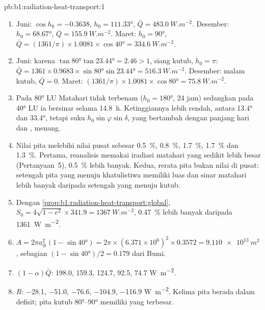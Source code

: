 \begin{solution}{pb:b1:radiation-heat-transport:1}
\begin{enumerate}
  \item Juni: $\cos h_0 = -0.3638$, $h_0 = \ang{111.33}$, $\bar Q =
        \qty{483.0}{W.m^{-2}}$. Desember: $h_0 = \ang{68.67}$, $\bar Q =
        \qty{155.9}{W.m^{-2}}$. Maret: $h_0 = \ang{90}$, $\bar Q = (1361/\pi)
        \times 1.0081 \times \cos\ang{40} = \qty{334.6}{W.m^{-2}}$.
  \item Juni: karena $\tan\ang{80}\tan\ang{23.44} = 2.46 > 1$, siang kutub, $h_0 = \pi$:
        $\bar Q = 1361 \times 0.9683 \times \sin\ang{80}\sin\ang{23.44} =
        \qty{516.3}{W.m^{-2}}$. Desember: malam kutub, $\bar Q = 0$. Maret:
        $(1361/\pi) \times 1.0081 \times \cos\ang{80} = \qty{75.8}{W.m^{-2}}$.
  \item Pada \ang{80} LU Matahari tidak terbenam ($h_0 = \ang{180}$, 24 jam) sedangkan pada
        \ang{40} LU ia bersinar selama \qty{14.8}{h}. Ketinggiannya lebih rendah, antara
        \ang{13.4} dan \ang{33.4}, tetapi suku $h_0\sin\varphi\sin\delta$, yang
        bertambah dengan panjang hari dan , menang.
  \item Nilai pita melebihi nilai pusat sebesar \qty{0.5}{\percent},
        \qty{0.8}{\percent}, \qty{1.7}{\percent}, \qty{1.7}{\percent} dan
        \qty{1.3}{\percent}. Pertama, reanalisis memakai iradiasi matahari yang sedikit lebih besar
        (Pertanyaan~5), \qty{0.5}{\percent} lebih banyak. Kedua, rerata pita bukan nilai di pusat:
        setengah pita yang menuju khatulistiwa memiliki luas dan sinar matahari lebih banyak daripada
        setengah yang menuju kutub.
  \item Dengan \cref{prop:b1:radiation-heat-transport:global}, $S_0 = 4\sqrt{1-e^2}
        \times 341.9 = \qty{1367}{W.m^{-2}}$, \qty{0.47}{\percent} lebih banyak daripada \qty{1361}{W.m^{-2}}.
  \item $A = 2\pi a_\oplus^2(1 - \sin\ang{40}) = 2\pi \times (6.371\times10^6)^2
        \times 0.3572 = \qty{9.110e13}{m^2}$, sebagian $(1 - \sin\ang{40})/2 =
        0.179$ dari Bumi.
  \item $(1 - \alpha)\bar Q$: \num{198.0}, \num{159.3}, \num{124.7}, \num{92.5},
        \num{74.7} \unit{W.m^{-2}}.
  \item $R$: \num{-28.1}, \num{-51.0}, \num{-76.6}, \num{-104.9}, \num{-116.9}
        \unit{W.m^{-2}}. Kelima pita berada dalam defisit; pita kutub
        \ang{80}--\ang{90} memiliki yang terbesar.

\end{enumerate}
\end{solution}
